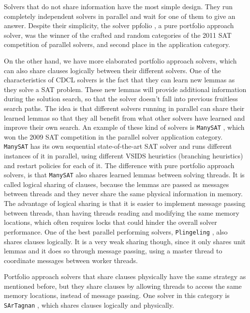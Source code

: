 \documentclass[12pt]{diicc}
\begin{document}
Solvers that do not share information have the most simple design. They run completely independent solvers in parallel and wait for one of them to give an answer. Despite their simplicity, the solver ppfolio \cite{ppfolio}, a pure portfolio approach solver, was the winner of the crafted and random categories of the 2011 SAT competition of parallel solvers, and second place in the application category. 

On the other hand, we have more elaborated portfolio approach solvers, which can also share clauses logically between their different solvers. One of the characteristics of CDCL solvers is the fact that they can learn new lemmas as they solve a SAT problem. These new lemmas will provide additional information during the solution search, so that the solver doesn't fall into previous fruitless search paths. The idea is that different solvers running in parallel can share their learned lemmas so that they all benefit from what other solvers have learned and improve their own search. An example of these kind of solvers is \texttt{ManySAT} \cite{manysat}, which won the 2009 SAT competition in the parallel solver application category. \texttt{ManySAT} has its own sequential state-of-the-art SAT solver and runs different instances of it in parallel, using different VSIDS \cite{vsids} heuristics (branching heuristics) and restart policies for each of it. The difference with pure portfolio approach solvers, is that \texttt{ManySAT} also shares learned lemmas between solving threads. It is called logical sharing of clauses, because the lemmas are passed as messages between threads and they never share the same physical information in memory. The advantage of logical sharing is that it is easier to implement message passing between threads, than having threads reading and modifying the same memory locations, which often requires locks that could hinder the overall solver performance. One of the best parallel performing solvers, \texttt{Plingeling} \cite{plingeling}, also shares clauses logically. It is a very weak sharing though, since it only shares unit lemmas and it does so through message passing, using a master thread to coordinate messages between worker threads. 

Portfolio approach solvers that share clauses physically have the same strategy as mentioned before, but they share clauses by allowing threads to access the same memory locations, instead of message passing. One solver in this category is \texttt{SArTagnan} \cite{sartagnan}, which shares clauses logically and physically. 
\end{document}
